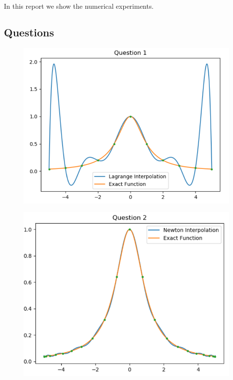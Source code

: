 In this report we show the numerical experiments. 
\subsection{Questions}
\begin{figure}[h]
	\centering
	\includegraphics[scale=.5]{../fig/q1.png}
\end{figure}
\begin{figure}[h]
	\centering
	\includegraphics[scale=.5]{../fig/q2.png}
\end{figure}
